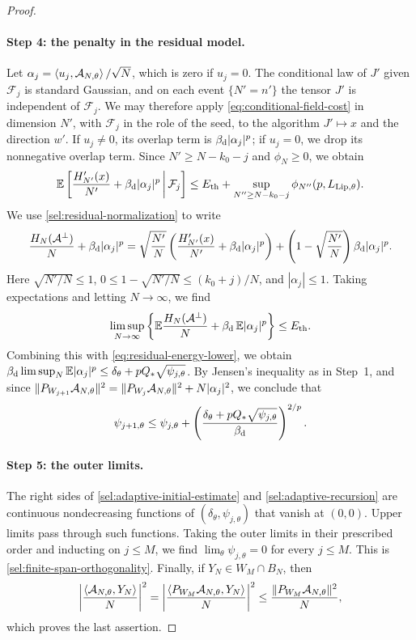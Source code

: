 \begin{proof}
\paragraph{Step 4: the penalty in the residual model.}
Let $\alpha_j=\left\langle u_j,\mathcal A_{N,\theta}\right\rangle/\sqrt N$, which is zero if
$u_j=0$. The conditional law of $J'$ given $\mathcal F_j$ is standard
Gaussian, and on each event $\{N'=n'\}$ the tensor $J'$ is independent of
$\mathcal F_j$. We may therefore apply \eqref{eq:conditional-field-cost} in
dimension $N'$, with $\mathcal F_j$ in the role of the seed, to the
algorithm $J'\mapsto x$ and the direction $w'$. If $u_j\ne0$, its overlap
term is $\beta_{\mathrm d}|\alpha_j|^p$; if $u_j=0$, we drop its nonnegative overlap
term. Since $N'\ge N-k_0-j$ and $\phi_N\ge0$, we obtain
\[
 \mathbb E\left[\frac{H'_{N'}(x)}{N'}+\beta_{\mathrm d}|\alpha_j|^p\,\middle|\,\mathcal F_j\right]
 \le E_{\mathrm{th}}+\sup_{N''\ge N-k_0-j}\phi_{N''}(p,L_{\mathrm{Lip},\theta}).
\]
We use \eqref{sel:residual-normalization} to write
\[
 \frac{H_N(\mathcal A^\perp)}N+\beta_{\mathrm d}|\alpha_j|^p
 =\sqrt{\frac{N'}N}\left(\frac{H'_{N'}(x)}{N'}+\beta_{\mathrm d}|\alpha_j|^p\right)
 +\left(1-\sqrt{\frac{N'}N}\right)\beta_{\mathrm d}|\alpha_j|^p.
\]
Here $\sqrt{N'/N}\le1$, $0\le1-\sqrt{N'/N}\le(k_0+j)/N$, and $|\alpha_j|\le1$.
Taking expectations and letting $N\to\infty$, we find
\[
 \limsup_{N\to\infty}\left\{\mathbb E\frac{H_N(\mathcal A^\perp)}N
 +\beta_{\mathrm d}\,\mathbb E|\alpha_j|^p\right\}\le E_{\mathrm{th}}.
\]
Combining this with \eqref{eq:residual-energy-lower}, we obtain
$\beta_{\mathrm d}\limsup_N\mathbb E|\alpha_j|^p\le\delta_\theta+pQ_*\sqrt{\psi_{j,\theta}}$. By
Jensen's inequality as in Step~1, and since
$\lVert P_{W_{j+1}}\mathcal A_{N,\theta}\rVert^2=\lVert P_{W_j}\mathcal A_{N,\theta}\rVert^2
+N|\alpha_j|^2$, we conclude that
\begin{equation}\label{sel:adaptive-recursion}
 \psi_{j+1,\theta}\le\psi_{j,\theta}
 +\left(\frac{\delta_\theta+pQ_*\sqrt{\psi_{j,\theta}}}{\beta_{\mathrm d}}\right)^{2/p}.
\end{equation}

\paragraph{Step 5: the outer limits.}
The right sides of \eqref{sel:adaptive-initial-estimate} and
\eqref{sel:adaptive-recursion} are continuous nondecreasing functions of
$(\delta_\theta,\psi_{j,\theta})$ that vanish at $(0,0)$. Upper limits pass
through such functions. Taking the outer limits in their prescribed order
and inducting on $j\le M$, we find
$\lim_\theta\psi_{j,\theta}=0$ for every $j\le M$. This is
\eqref{sel:finite-span-orthogonality}. Finally, if
$Y_N\in W_M\cap B_N$, then
\[
 \left|\frac{\left\langle\mathcal A_{N,\theta},Y_N\right\rangle}N\right|^2
 =\left|\frac{\left\langle P_{W_M}\mathcal A_{N,\theta},Y_N\right\rangle}N\right|^2
 \le\frac{\lVert P_{W_M}\mathcal A_{N,\theta}\rVert^2}N,
\]
which proves the last assertion.
\end{proof}

